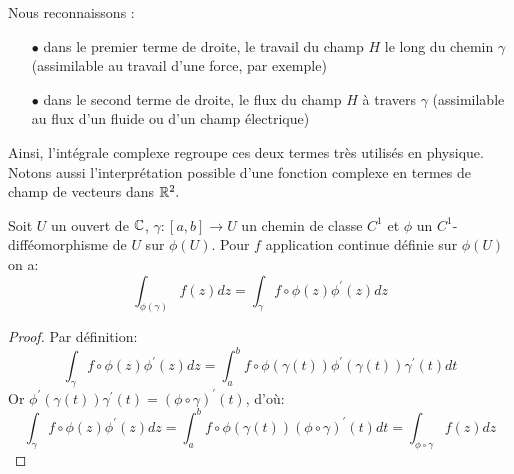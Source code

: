 Nous reconnaissons :
\begin{itemize}
    \item[$\bullet$] dans le premier terme de droite, le travail du champ $H$ le long du chemin $\gamma$ (assimilable au travail d'une force, par exemple)
    \item[$\bullet$] dans le second terme de droite, le flux du champ $H$ à travers $\gamma$ (assimilable au flux d'un fluide ou d'un champ électrique)
\end{itemize} 

Ainsi, l'intégrale complexe regroupe ces deux termes très utilisés en physique. Notons aussi l'interprétation possible d'une fonction complexe en termes de champ de vecteurs dans $\mathbb R^2.$
\begin{fprop}
\label{prop:changement_variable}
Soit $U$ un ouvert de $\mathbb{C}$, $\gamma \colon [a,b] \to U$ un chemin de classe $C^1$ et $\phi$ un $C^1$-difféomorphisme de $U$ sur $\phi(U)$. Pour $f$ application continue définie sur $\phi(U)$ on a:
\[
\int_{\phi(\gamma)} f(z) dz = \int_{\gamma} f \circ \phi (z) \phi^\prime(z) dz
\]
\end{fprop}
\begin{proof}
    Par définition:
    \[
\int_{\gamma} f \circ \phi (z) \phi^\prime(z) dz = \int_a^b f \circ \phi \left( \gamma(t) \right) \phi^\prime\left(
\gamma(t) \right) \gamma^\prime(t) dt
    \]
    Or $ \phi^\prime\left(
\gamma(t) \right) \gamma^\prime(t) = \left( \phi \circ \gamma \right)^\prime(t)$, d'où:
\[
\int_{\gamma} f \circ \phi (z) \phi^\prime(z) dz = \int_a^b f \circ \phi \left( \gamma(t) \right)\left( \phi \circ \gamma \right)^\prime(t) dt = \int_{\phi \circ \gamma} f(z) dz
    \]
\end{proof}

